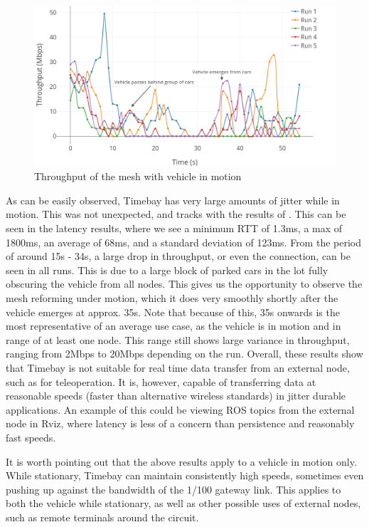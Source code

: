 \documentclass[journal]{IEEEtran}
\begin{document}
\begin{figure}[t]
    \centering
    \includegraphics[width=\linewidth]{images/throughput.png}
    \caption{Throughput of the mesh with vehicle in motion}
    \label{fig:throughput}
\end{figure}

As can be easily observed, Timebay has very large amounts of jitter while in motion. This was not unexpected, and tracks with the results of \cite{8417706}. This can be seen in the latency results, where we see a minimum RTT of 1.3ms, a max of 1800ms, an average of 68ms, and a standard deviation of 123ms. From the period of around 15s - 34s, a large drop in throughput, or even the connection, can be seen in all runs. This is due to a large block of parked cars in the lot fully obscuring the vehicle from all nodes. This gives us the opportunity to observe the mesh reforming under motion, which it does very smoothly shortly after the vehicle emerges at approx. 35s. Note that because of this, 35s onwards is the most representative of an average use case, as the vehicle is in motion and in range of at least one node. This range still shows large variance in throughput, ranging from 2Mbps to 20Mbps depending on the run. Overall, these results show that Timebay is not suitable for real time data transfer from an external node, such as for teleoperation. It is, however, capable of transferring data at reasonable speeds (faster than alternative wireless standards) in jitter durable applications. An example of this could be viewing ROS topics from the external node in Rviz, where latency is less of a concern than persistence and reasonably fast speeds.

It is worth pointing out that the above results apply to a vehicle in motion only. While stationary, Timebay can maintain consistently high speeds, sometimes even pushing up against the bandwidth of the 1/100 gateway link. This applies to both the vehicle while stationary, as well as other possible uses of external nodes, such as remote terminals around the circuit.
\end{document}
